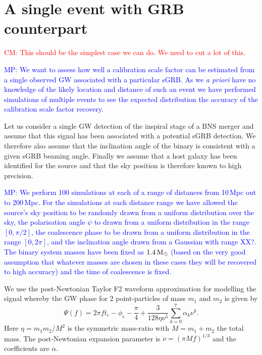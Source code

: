 \documentclass[12pt]{iopart}
\newcommand{\cm}[1]{\textcolor{red}{CM: #1}}
\newcommand{\MP}[1]{\textcolor{blue}{MP: #1}}
\begin{document}
\section{A single event with GRB counterpart\label{sec:single}}

\cm{This should be the simplest case we can do.  We need to cut a lot of this.}

\MP{We want to assess how well a calibration scale factor can be estimated
from a single observed \ac{GW} associated with a particular \ac{sGRB}. As we {\it a priori}
have no knowledge of the likely location and distance of such an event we have performed
simulations of multiple events to see the expected distribution the accuracy of the
calibration scale factor recovery.}

Let us consider a single \ac{GW} detection of the inspiral stage of a \ac{BNS}
merger and assume that this signal has been associated with a potential
\ac{sGRB} detection. We therefore also assume that the inclination angle
of the binary is consistent with a given \ac{sGRB} beaming angle.  Finally we
assume that a host galaxy has been identified for the source and that the sky
position is therefore known to high precision.

\MP{We perform 100 simulations at each of a range of distances from 10\,Mpc out
to 200\,Mpc. For the simulations at each distance range we have allowed the
source's sky position to be randomly drawn from a uniform distribution over
the sky, the polarisation angle $\psi$ to drawn from a uniform distribution in the
range $[0, \pi/2]$, the coalescence phase to be drawn from a uniform distribution
in the range $[0, 2\pi]$, and the inclination angle drawn from a Gaussian with range XX?.
The binary system masses have been fixed as $1.4\,{\rm M}_\odot$ (based on the
very good assumption that whatever masses are chosen in these cases they will be
recovered to high accuracy) and the time of coalescence is fixed.}
 
We use the post-Newtonian Taylor F2 waveform approximation for modelling the
signal whereby the \ac{GW} phase for 2 point-particles of mass $m_{1}$ and
$m_{2}$ is given by
%
\begin{equation}
\label{eq:gwphase}
  \Psi(f) = 2\pi f t_\mathrm{c} - \phi_{\mathrm{c}} - \frac{\pi}{4} +
\frac{3}{128\eta\nu^{5}}\sum\limits_{k=0}^{7}\alpha_{k}\nu^{k}.
\end{equation}
%
Here $\eta=m_{1}m_{2}/M^{2}$ is the symmetric mass-ratio with $M=m_{1}+m_{2}$
the total mass.  The post-Newtonian expansion parameter is $\nu=(\pi M
f)^{1/3}$ and the coefficients are $\alpha$.
\end{document}

